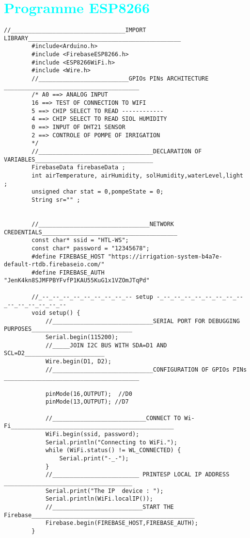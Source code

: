\section*{\textcolor{cyan}{Programme ESP8266}}

\begin{flushleft}
	\begin{lstlisting}[style=CStyle]
		//_________________________________IMPORT LIBRARY____________________________________________
		#include<Arduino.h>
		#include <FirebaseESP8266.h>
		#include <ESP8266WiFi.h>
		#include <Wire.h>
		//__________________________GPIOs PINs ARCHITECTURE _______________________________________
		/* A0 ==> ANALOG INPUT
		16 ==> TEST OF CONNECTION TO WIFI
		5 ==> CHIP SELECT TO READ ------------ 
		4 ==> CHIP SELECT TO READ SIOL HUMIDITY
		0 ==> INPUT OF DHT21 SENSOR
		2 ==> CONTROLE OF POMPE OF IRRIGATION
		*/
		//_________________________________DECLARATION OF VARIABLES__________________________________
		FirebaseData firebaseData ;
		int airTemperature, airHumidity, solHumidity,waterLevel,light ;
		unsigned char stat = 0,pompeState = 0;
		String sr="" ;
		
		
		//________________________________NETWORK CREDENTIALS_______________________________________
		const char* ssid = "HTL-WS";
		const char* password = "12345678";
		#define FIREBASE_HOST "https://irrigation-system-b4a7e-default-rtdb.firebaseio.com/" 
		#define FIREBASE_AUTH "JenK4kn8SJMFPBYFvfP1KAU55KuG1x1VZOmJTqPd"
		
		//_--_--_--_--_--_--_--_--_-- setup -_--_--_--_--_--_--_--_--_--_--_--_--_--_--
		void setup() {
			//_____________________________SERIAL PORT FOR DEBUGGING PURPOSES_____________________________
			Serial.begin(115200);
			//_____JOIN I2C BUS WITH SDA=D1 AND SCL=D2_______________________
			Wire.begin(D1, D2); 
			//_____________________________CONFIGURATION OF GPIOs PINs _______________________________________
			
			pinMode(16,OUTPUT);  //D0
			pinMode(13,OUTPUT); //D7
			
			//___________________________CONNECT TO Wi-Fi_______________________________________________
			WiFi.begin(ssid, password);
			Serial.println("Connecting to WiFi.");
			while (WiFi.status() != WL_CONNECTED) {
				Serial.print("-_-");
			}
			//_________________________ PRINTESP LOCAL IP ADDRESS _____________________________________
			Serial.print("The IP  device : ");
			Serial.println(WiFi.localIP());
			//__________________________START THE Firebase_______________________________________________
			Firebase.begin(FIREBASE_HOST,FIREBASE_AUTH);
		}
		

\end{lstlisting}
\end{flushleft}
